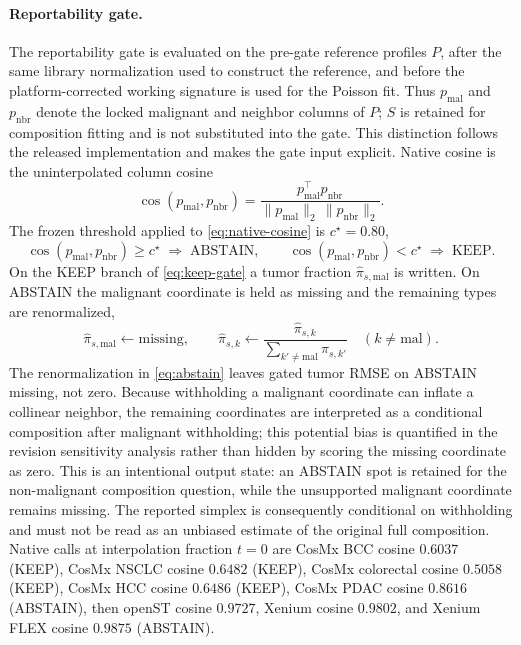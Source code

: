 \paragraph{Reportability gate.}
The reportability gate is evaluated on the pre-gate reference profiles \(P\), after the same library normalization used to construct the reference, and before the platform-corrected working signature is used for the Poisson fit. Thus \(p_{\mathrm{mal}}\) and \(p_{\mathrm{nbr}}\) denote the locked malignant and neighbor columns of \(P\); \(S\) is retained for composition fitting and is not substituted into the gate. This distinction follows the released implementation and makes the gate input explicit.
Native cosine is the uninterpolated column cosine
\begin{equation}
\cos(p_{\mathrm{mal}},p_{\mathrm{nbr}})=\frac{p_{\mathrm{mal}}^{\top}p_{\mathrm{nbr}}}{\lVert p_{\mathrm{mal}}\rVert_2\,\lVert p_{\mathrm{nbr}}\rVert_2}.
\label{eq:native-cosine}
\end{equation}
The frozen threshold applied to \eqref{eq:native-cosine} is \(c^\star=0.80\),
\begin{equation}
\cos(p_{\mathrm{mal}},p_{\mathrm{nbr}})\ge c^\star \;\Rightarrow\; \text{ABSTAIN},\qquad
\cos(p_{\mathrm{mal}},p_{\mathrm{nbr}})< c^\star \;\Rightarrow\; \text{KEEP}.
\label{eq:keep-gate}
\end{equation}
On the KEEP branch of \eqref{eq:keep-gate} a tumor fraction \(\hat\pi_{s,\mathrm{mal}}\) is written. On ABSTAIN the malignant coordinate is held as missing and the remaining types are renormalized,
\begin{equation}
\hat\pi_{s,\mathrm{mal}}\leftarrow\mathrm{missing},\qquad
\hat\pi_{s,k}\leftarrow\frac{\hat\pi_{s,k}}{\sum_{k'\neq\mathrm{mal}}\hat\pi_{s,k'}}\quad(k\neq\mathrm{mal}).
\label{eq:abstain}
\end{equation}
The renormalization in \eqref{eq:abstain} leaves gated tumor RMSE on ABSTAIN missing, not zero. Because withholding a malignant coordinate can inflate a collinear neighbor, the remaining coordinates are interpreted as a conditional composition after malignant withholding; this potential bias is quantified in the revision sensitivity analysis rather than hidden by scoring the missing coordinate as zero. This is an intentional output state: an ABSTAIN spot is retained for the non-malignant composition question, while the unsupported malignant coordinate remains missing. The reported simplex is consequently conditional on withholding and must not be read as an unbiased estimate of the original full composition. Native calls at interpolation fraction \(t=0\) are CosMx BCC cosine \(0.6037\) (KEEP), CosMx NSCLC cosine \(0.6482\) (KEEP), CosMx colorectal cosine \(0.5058\) (KEEP), CosMx HCC cosine \(0.6486\) (KEEP), CosMx PDAC cosine \(0.8616\) (ABSTAIN), then openST cosine \(0.9727\), Xenium cosine \(0.9802\), and Xenium FLEX cosine \(0.9875\) (ABSTAIN).

